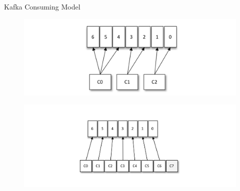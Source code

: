 \begin{frame}[plain,t]{Kafka Consuming Model} %
	 \\ 
	\begin{figure}
		\centering
		\includegraphics[width=0.9\linewidth]{image/0304}
		\label{fig:0304}
	\end{figure}
 \vspace{-4ex}
\begin{figure}
	\centering
	\includegraphics[width=0.9\linewidth]{image/0305}
	\label{fig:0305}
\end{figure}

	
\end{frame}



